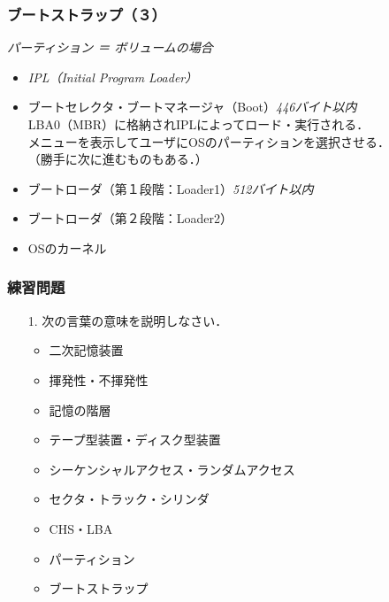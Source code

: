 \documentclass{beamer}                   %
\begin{document}
\begin{frame}
  \frametitle{ブートストラップ（３）}
  \emph{パーティション ＝ ボリュームの場合}
  \begin{itemize}
  \item \emph{IPL（Initial Program Loader）}
  \item ブートセレクタ・ブートマネージャ（Boot）\emph{446バイト以内} \\
    \small{LBA0（MBR）に格納されIPLによってロード・実行される．\\
    メニューを表示してユーザにOSのパーティションを選択させる．\\
    （勝手に次に進むものもある．）}
  \item ブートローダ（第１段階：Loader1）\emph{512バイト以内} 
  \item ブートローダ（第２段階：Loader2）
  \item OSのカーネル
  \end{itemize}
\end{frame}

\begin{frame}
  \frametitle{練習問題}
  \begin{enumerate}
  \item[1.] 次の言葉の意味を説明しなさい．
    \begin{itemize}
    \item 二次記憶装置
    \item 揮発性・不揮発性
    \item 記憶の階層
    \item テープ型装置・ディスク型装置
    \item シーケンシャルアクセス・ランダムアクセス
    \item セクタ・トラック・シリンダ
    \item CHS・LBA
    \item パーティション
    \item ブートストラップ
    \end{itemize}
  \end{enumerate}
\end{frame}

\end{document}

